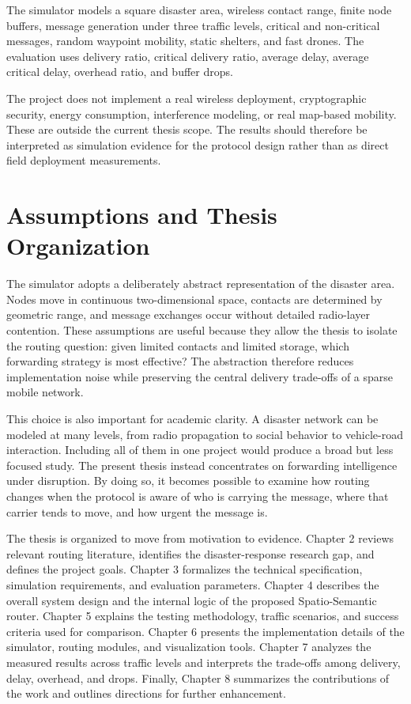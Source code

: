 The simulator models a square disaster area, wireless contact range, finite node buffers, message generation under three traffic levels, critical and non-critical messages, random waypoint mobility, static shelters, and fast drones. The evaluation uses delivery ratio, critical delivery ratio, average delay, average critical delay, overhead ratio, and buffer drops.

The project does not implement a real wireless deployment, cryptographic security, energy consumption, interference modeling, or real map-based mobility. These are outside the current thesis scope. The results should therefore be interpreted as simulation evidence for the protocol design rather than as direct field deployment measurements.

\section{Assumptions and Thesis Organization}
The simulator adopts a deliberately abstract representation of the disaster area. Nodes move in continuous two-dimensional space, contacts are determined by geometric range, and message exchanges occur without detailed radio-layer contention. These assumptions are useful because they allow the thesis to isolate the routing question: given limited contacts and limited storage, which forwarding strategy is most effective? The abstraction therefore reduces implementation noise while preserving the central delivery trade-offs of a sparse mobile network.

This choice is also important for academic clarity. A disaster network can be modeled at many levels, from radio propagation to social behavior to vehicle-road interaction. Including all of them in one project would produce a broad but less focused study. The present thesis instead concentrates on forwarding intelligence under disruption. By doing so, it becomes possible to examine how routing changes when the protocol is aware of who is carrying the message, where that carrier tends to move, and how urgent the message is.

The thesis is organized to move from motivation to evidence. Chapter 2 reviews relevant routing literature, identifies the disaster-response research gap, and defines the project goals. Chapter 3 formalizes the technical specification, simulation requirements, and evaluation parameters. Chapter 4 describes the overall system design and the internal logic of the proposed Spatio-Semantic router. Chapter 5 explains the testing methodology, traffic scenarios, and success criteria used for comparison. Chapter 6 presents the implementation details of the simulator, routing modules, and visualization tools. Chapter 7 analyzes the measured results across traffic levels and interprets the trade-offs among delivery, delay, overhead, and drops. Finally, Chapter 8 summarizes the contributions of the work and outlines directions for further enhancement.

